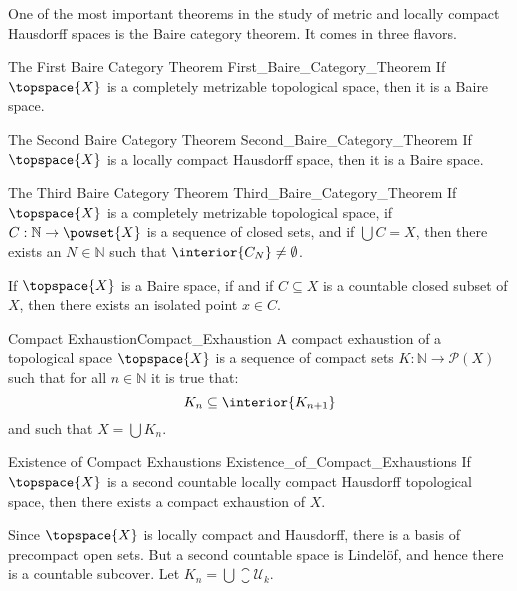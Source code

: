 \documentclass{article}                                                        %
\begin{document}
        One of the most important theorems in the study of metric and locally
        compact Hausdorff spaces is the Baire category theorem. It comes in
        three flavors.
        \begin{ftheorem}{The First Baire Category Theorem}
                        {First_Baire_Category_Theorem}
            If $\topspace{X}$ is a completely metrizable topological space,
            then it is a Baire space.
        \end{ftheorem}
        \begin{ftheorem}{The Second Baire Category Theorem}
                        {Second_Baire_Category_Theorem}
            If $\topspace{X}$ is a locally compact Hausdorff space, then it is
            a Baire space.
        \end{ftheorem}
        \begin{ftheorem}{The Third Baire Category Theorem}
                        {Third_Baire_Category_Theorem}
            If $\topspace{X}$ is a completely metrizable topological space,
            if $C:\mathbb{N}\rightarrow\powset{X}$ is a sequence of closed sets,
            and if $\bigcup{C}=X$, then there exists an $N\in\mathbb{N}$ such
            that $\interior{C_{N}}\ne\emptyset$.
        \end{ftheorem}
        \begin{theorem}
            If $\topspace{X}$ is a Baire space, if and if $C\subseteq{X}$ is a
            countable closed subset of $X$, then there exists an isolated point
            $x\in{C}$.
        \end{theorem}
        \begin{fdefinition}{Compact Exhaustion}{Compact_Exhaustion}
            A compact exhaustion of a topological space $\topspace{X}$ is a
            sequence of compact sets $K:\mathbb{N}\rightarrow\mathcal{P}(X)$
            such that for all $n\in\mathbb{N}$ it is true that:
            \begin{equation*}
                K_{n}\subseteq\interior{{K}_{n+1}}
            \end{equation*}
            and such that $X=\bigcup{K}_{n}$.
        \end{fdefinition}
        \begin{ftheorem}{Existence of Compact Exhaustions}
                        {Existence_of_Compact_Exhaustions}
            If $\topspace{X}$ is a second countable locally compact Hausdorff
            topological space, then there exists a compact exhaustion of $X$.
        \end{ftheorem}
        \begin{bproof}
            Since $\topspace{X}$ is locally compact and Hausdorff, there is a
            basis of precompact open sets. But a second countable space is
            Lindel\"{o}f, and hence there is a countable subcover. Let
            $K_{n}=\bigcup\closure{\mathcal{U}_{k}}$.
        \end{bproof}
\end{document}
